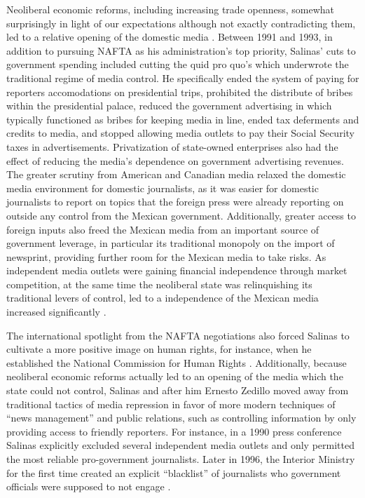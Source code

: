 \documentclass[a4paper]{article}\usepackage[]{graphicx}\usepackage[]{color}
\begin{document}
Neoliberal economic reforms, including increasing trade openness, somewhat surprisingly in light of our expectations although not exactly contradicting them, led to a relative opening of the domestic media \parencite{lawson2002building}. Between 1991 and 1993, in addition to pursuing NAFTA as his administration's top priority, Salinas' cuts to government spending included cutting the quid pro quo's which underwrote the traditional regime of media control. He specifically ended the system of paying for reporters accomodations on presidential trips, prohibited the distribute of bribes within the presidential palace, reduced the government advertising in which typically functioned as bribes for keeping media in line, ended tax deferments and credits to media, and stopped allowing media outlets to pay their Social Security taxes in advertisements. Privatization of state-owned enterprises also had the effect of reducing the media's dependence on government advertising revenues. The greater scrutiny from American and Canadian media relaxed the domestic media environment for domestic journalists, as it was easier for domestic journalists to report on topics that the foreign press were already reporting on outside any control from the Mexican government. Additionally, greater access to foreign inputs also freed the Mexican media from an important source of government leverage, in particular its traditional monopoly on the import of newsprint, providing further room for the Mexican media to take risks. As independent media outlets were gaining financial independence through market competition, at the same time the neoliberal state was relinquishing its traditional levers of control, led to a independence of the Mexican media increased significantly \parencite[76,89]{lawson2002building}.

The international spotlight from the NAFTA negotiations also forced Salinas to cultivate a more positive image on human rights, for instance, when he established the National Commission for Human Rights \parencite[107]{Dominguez:2009wd}. Additionally, because neoliberal economic reforms actually led to an opening of the media which the state could not control, Salinas and after him Ernesto Zedillo moved away from traditional tactics of media repression in favor of more modern techniques of “news management” and public relations, such as controlling information by only providing access to friendly reporters. For instance, in a 1990 press conference Salinas explicitly excluded several independent media outlets and only permitted the most reliable pro-government journalists. Later in 1996, the Interior Ministry for the first time created an explicit “blacklist” of journalists who government officials were supposed to not engage \parencite[39]{lawson2002building}.
\end{document}
